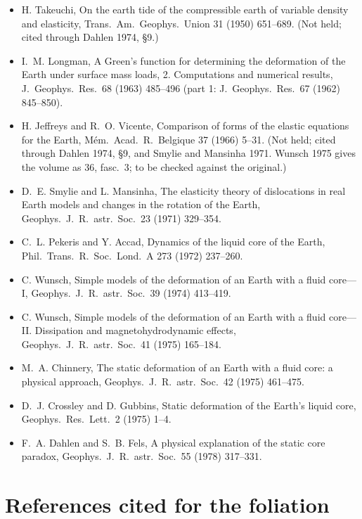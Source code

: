 \documentclass[11pt]{article}
\theoremstyle{definition}
\theoremstyle{remark}
\begin{document}
\begin{itemize}\small
\item H. Takeuchi, On the earth tide of the compressible earth of
  variable density and elasticity, Trans.\ Am.\ Geophys.\ Union 31
  (1950) 651--689. (Not held; cited through Dahlen 1974, \S9.)
\item I.~M. Longman, A Green's function for determining the
  deformation of the Earth under surface mass loads, 2. Computations
  and numerical results, J.\ Geophys.\ Res.\ 68 (1963) 485--496 (part
  1: J.\ Geophys.\ Res.\ 67 (1962) 845--850).
\item H. Jeffreys and R.~O. Vicente, Comparison of forms of the
  elastic equations for the Earth, M\'em.\ Acad.\ R.\ Belgique 37
  (1966) 5--31. (Not held; cited through Dahlen 1974, \S9, and Smylie
  and Mansinha 1971. Wunsch 1975 gives the volume as 36, fasc.~3; to
  be checked against the original.)
\item D.~E. Smylie and L. Mansinha, The elasticity theory of
  dislocations in real Earth models and changes in the rotation of the
  Earth, Geophys.\ J.\ R.\ astr.\ Soc.\ 23 (1971) 329--354.
\item C.~L. Pekeris and Y. Accad, Dynamics of the liquid core of the
  Earth, Phil.\ Trans.\ R.\ Soc.\ Lond.\ A 273 (1972) 237--260.
\item C. Wunsch, Simple models of the deformation of an Earth with a
  fluid core---I, Geophys.\ J.\ R.\ astr.\ Soc.\ 39 (1974) 413--419.
\item C. Wunsch, Simple models of the deformation of an Earth with a
  fluid core---II. Dissipation and magnetohydrodynamic effects,
  Geophys.\ J.\ R.\ astr.\ Soc.\ 41 (1975) 165--184.
\item M.~A. Chinnery, The static deformation of an Earth with a fluid
  core: a physical approach, Geophys.\ J.\ R.\ astr.\ Soc.\ 42 (1975)
  461--475.
\item D.~J. Crossley and D. Gubbins, Static deformation of the Earth's
  liquid core, Geophys.\ Res.\ Lett.\ 2 (1975) 1--4.
\item F.~A. Dahlen and S.~B. Fels, A physical explanation of the
  static core paradox, Geophys.\ J.\ R.\ astr.\ Soc.\ 55 (1978)
  317--331.
\end{itemize}

\section*{References cited for the foliation}
\end{document}
